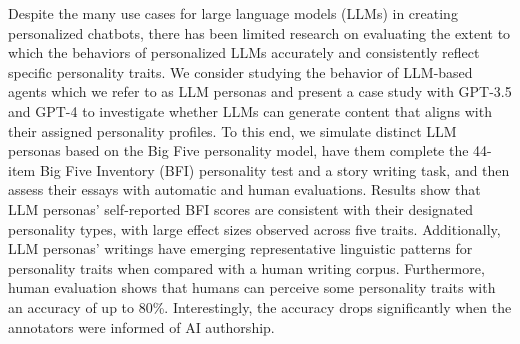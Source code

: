 Despite the many use cases for large language models (LLMs) in creating personalized chatbots, there has been limited research on evaluating the extent to which the behaviors of personalized LLMs accurately and consistently reflect specific personality traits. We consider studying the behavior of LLM-based agents which we refer to as LLM personas and present a case study with GPT-3.5 and GPT-4 to investigate whether LLMs can generate content that aligns with their assigned personality profiles. To this end, we simulate distinct LLM personas based on the Big Five personality model, have them complete the 44-item Big Five Inventory (BFI) personality test and a story writing task, and then assess their essays with automatic and human evaluations. Results show that LLM personas' self-reported BFI scores are consistent with their designated personality types, with large effect sizes observed across five traits. Additionally, LLM personas' writings have emerging representative linguistic patterns for personality traits when compared with a human writing corpus. Furthermore, human evaluation shows that humans can perceive some personality traits with an accuracy of up to 80\%. Interestingly, the accuracy drops significantly when the annotators were informed of AI authorship.